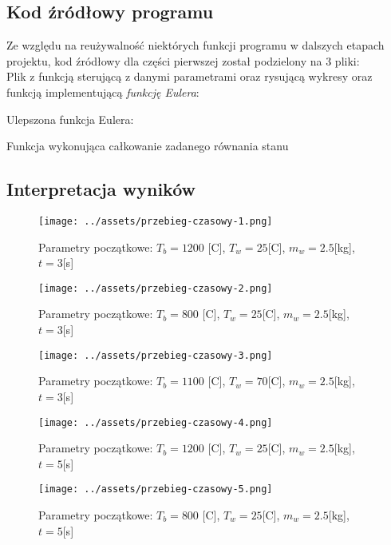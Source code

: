 \documentclass[
	12pt, %
]{fphw}
\begin{document}
\subsection{Kod źródłowy programu}
Ze względu na reużywalność niektórych funkcji programu w dalszych etapach projektu,
kod źródłowy dla części pierwszej został podzielony na 3 pliki: \\
Plik z funkcją sterującą z danymi parametrami oraz rysującą wykresy
oraz funkcją implementującą \textit{funkcję Eulera}:

Ulepszona funkcja Eulera:

Funkcja wykonująca całkowanie zadanego równania stanu

\subsection{Interpretacja wyników}

\begin{figure}[H]
	\texttt{[image: ../assets/przebieg-czasowy-1.png]}
	\caption{Parametry początkowe: \(T_b = 1200\) [\textdegree{}C], \(T_w = 25\)[\textdegree{}C], \(m_w = 2.5\)[kg], \(t = 3\)[s]}
\end{figure}

\begin{figure}[H]
	\texttt{[image: ../assets/przebieg-czasowy-2.png]}
	\caption{Parametry początkowe: \(T_b = 800\) [\textdegree{}C], \(T_w = 25\)[\textdegree{}C], \(m_w = 2.5\)[kg], \(t = 3\)[s]}
\end{figure}

\begin{figure}[H]
	\texttt{[image: ../assets/przebieg-czasowy-3.png]}
	\caption{Parametry początkowe: \(T_b = 1100\) [\textdegree{}C], \(T_w = 70\)[\textdegree{}C], \(m_w = 2.5\)[kg], \(t = 3\)[s]}
\end{figure}

\begin{figure}[H]
	\texttt{[image: ../assets/przebieg-czasowy-4.png]}
	\caption{Parametry początkowe: \(T_b = 1200\) [\textdegree{}C], \(T_w = 25\)[\textdegree{}C], \(m_w = 2.5\)[kg], \(t = 5\)[s]}
\end{figure}

\begin{figure}[H]
	\texttt{[image: ../assets/przebieg-czasowy-5.png]}
	\caption{Parametry początkowe: \(T_b = 800\) [\textdegree{}C], \(T_w = 25\)[\textdegree{}C], \(m_w = 2.5\)[kg], \(t = 5\)[s]}
\end{figure}
\end{document}
